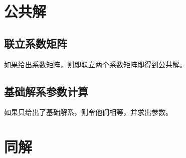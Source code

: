 \section{公共解}

\subsection{联立系数矩阵}

如果给出系数矩阵，则即联立两个系数矩阵即得到公共解。

\subsection{基础解系参数计算}

如果只给出了基础解系，则令他们相等，并求出参数。

\section{同解}

%